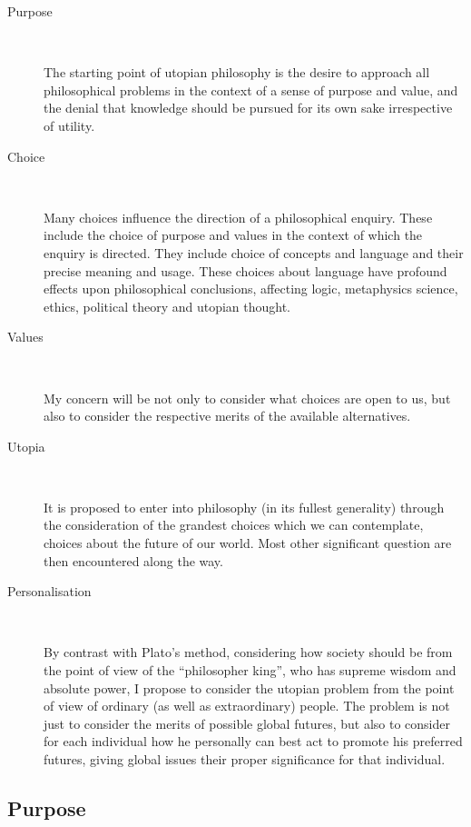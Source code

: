 \begin{description}

\item[Purpose]\ 

The starting point of utopian philosophy is the desire to approach all philosophical problems in the context of a sense of purpose and value, and the denial that knowledge should be pursued for its own sake irrespective of utility.

\item[Choice]\ 

Many choices influence the direction of a philosophical enquiry.
These include the choice of purpose and values in the context of which the enquiry is directed.
They include choice of concepts and language and their precise meaning and usage.
These choices about language have profound effects upon philosophical conclusions, affecting logic, metaphysics science, ethics, political theory and utopian thought. 

\item[Values]\ 

My concern will be not only to consider what choices are open to us, but also to consider the respective merits of the available alternatives.

\item[Utopia]\ 

It is proposed to enter into philosophy (in its fullest generality) through the consideration of the grandest choices which we can contemplate, choices about the future of our world.
Most other significant question are then encountered along the way.

\item[Personalisation]\ 

By contrast with Plato's method, considering how society should be from the point of view of the ``philosopher king'', who has supreme wisdom and absolute power, I propose to consider the utopian problem from the point of view of ordinary (as well as extraordinary) people.
The problem is not just to consider the merits of possible global futures, but also to consider for each individual how he personally can best act to promote his preferred futures, giving global issues their proper significance for that individual.

\end{description}

\subsection{Purpose}

